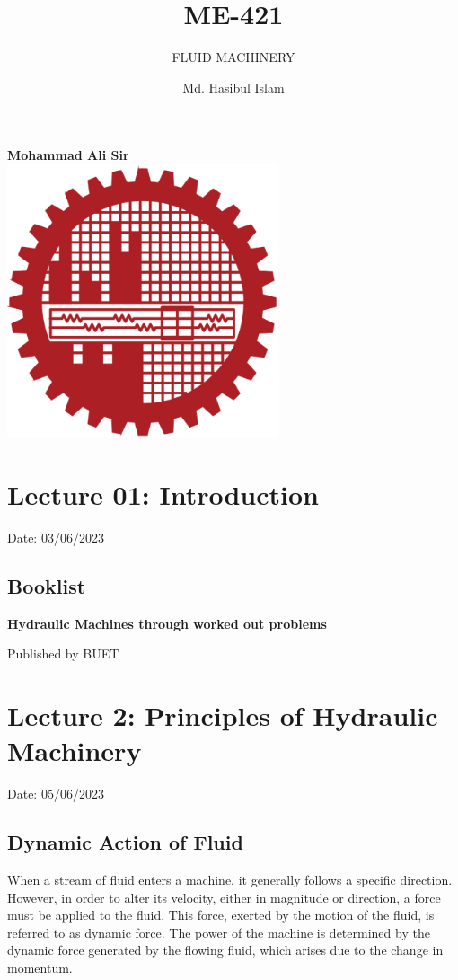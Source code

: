 \documentclass{article}
\title{ME-421}
\author{Md. Hasibul Islam}
\subtitle{FLUID MACHINERY}
\begin{document}
\begin{titlepage}
    \centering
    
    {\Huge\bfseries\maketitle}
    \textbf{Mohammad Ali Sir} \\
    \vspace{2cm}
    \includegraphics[width=8cm]{institution_logo.jpg}
    \vfill
    \vspace*{2cm}
\end{titlepage}

\tableofcontents
\pagebreak
\section{Lecture 01: Introduction} 
\hfill Date: 03/06/2023
\subsection*{Booklist}

\textbf{Hydraulic Machines through worked out problems}

\hfill Published by BUET


\section{Lecture 2: Principles of Hydraulic Machinery}
\hfill Date: 05/06/2023

\subsection{Dynamic Action of Fluid}

When a stream of fluid enters a machine, it generally follows a specific direction. However, in order to alter its velocity, either in magnitude or direction, a force must be applied to the fluid. This force, exerted by the motion of the fluid, is referred to as dynamic force. The power of the machine is determined by the dynamic force generated by the flowing fluid, which arises due to the change in momentum.
\end{document}
